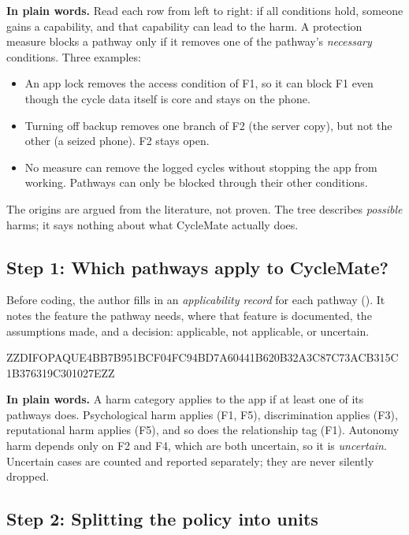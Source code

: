 \documentclass[twoside,its]{bossthesis}
\begin{document}
\noindent\textbf{In plain words.} Read each row from left to right: if all
conditions hold, someone gains a capability, and that capability can lead to
the harm. A protection measure blocks a pathway only if it removes one of the
pathway's \emph{necessary} conditions. Three examples:
\begin{itemize}
  \item An app lock removes the access condition of F1, so it can block F1
    even though the cycle data itself is core and stays on the phone.
  \item Turning off backup removes one branch of F2 (the server copy), but
    not the other (a seized phone). F2 stays open.
  \item No measure can remove the logged cycles without stopping the app from
    working. Pathways can only be blocked through their other conditions.
\end{itemize}
The origins are argued from the literature, not proven. The tree describes
\emph{possible} harms; it says nothing about what CycleMate actually does.

\subsection*{Step 1: Which pathways apply to CycleMate?}

Before coding, the author fills in an \emph{applicability record} for each
pathway (). It notes the feature the pathway needs,
where that feature is documented, the assumptions made, and a decision:
applicable, not applicable, or uncertain.



ZZDIFOPAQUE4BB7B951BCF04FC94BD7A60441B620B32A3C87C73ACB315C1B376319C301027EZZ



\noindent\textbf{In plain words.} A harm category applies to the app if at
least one of its pathways does. Psychological harm applies (F1, F5),
discrimination applies (F3), reputational harm applies (F5), and so does the
relationship tag (F1). Autonomy harm depends only on F2 and F4, which are both
uncertain, so it is \emph{uncertain}. Uncertain cases are counted and
reported separately; they are never silently dropped.

\subsection*{Step 2: Splitting the policy into units}
\end{document}
